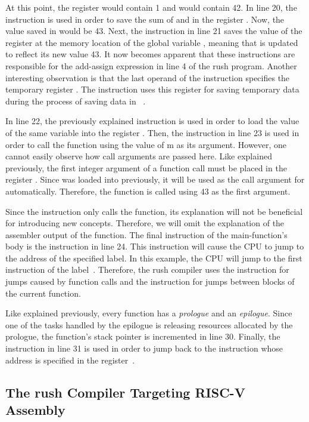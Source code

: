 At this point, the register  would contain 1 and  would contain 42.
In line 20, the  instruction is used in order to save the sum of  and  in the register .
Now, the value saved in  would be 43.
Next, the  instruction in line 21 saves the value of the register  at the memory location of the global variable , meaning that  is updated to reflect its new value 43.
It now becomes apparent that these instructions are responsible for the add-assign expression in line 4 of the rush program.
Another interesting observation is that the last operand of the  instruction specifies the temporary register .
The instruction uses this register for saving temporary data during the process of saving data in ~\cite[reference]{Patterson2017}.

In line 22, the previously explained  instruction is used in order to load the value of the same variable into the register .
Then, the  instruction in line 23 is used in order to call the  function using the value of m as its argument.
However, one cannot easily observe how call arguments are passed here.
Like explained previously, the first integer argument of a function call must be placed in the register .
Since  was loaded into  previously, it will be used as the call argument for  automatically.
Therefore, the  function is called using 43 as the first argument.

Since the  instruction only calls the  function, its explanation will not be beneficial for introducing new concepts.
Therefore, we will omit the explanation of the assembler output of the  function.
The final instruction of the main-function's body is the  instruction in line 24.
This instruction will cause the CPU to jump to the address of the specified label.
In this example, the CPU will jump to the first instruction of the  label~\cite[p.~17]{Patterson2017}.
Therefore, the rush compiler uses the  instruction for jumps caused by function calls and the  instruction for jumps between blocks of the current function.

Like explained previously, every function has a \emph{prologue} and an \emph{epilogue}.
Since one of the tasks handled by the epilogue is releasing resources allocated by the prologue, the function's stack pointer is incremented in line 30.
Finally, the  instruction in line 31 is used in order to jump back to the instruction whose address is specified in the  register~\cite[reference]{Patterson2017}.

\subsection{The rush Compiler Targeting RISC-V Assembly}

